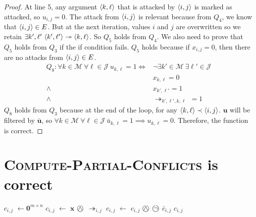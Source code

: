 \begin{proof}
	At line 5, any argument $\langle{k},{\ell}\rangle$ that is attacked by $\langle{i},{j}\rangle$ is marked as attacked, so $u_{i,j}=0$. The attack from $\langle{i},{j}\rangle$ is relevant because from $Q_4$, we know that $\langle{i},{j}\rangle\in E$. But at the next iteration, values $i$ and $j$ are overwritten so we retain $\exists k',\ell'\ \langle{k'},{\ell'}\rangle\twoheadrightarrow\langle{k},{\ell}\rangle$. So $Q_5$ holds from $Q_4$.
	\linespace
	We also need to prove that $Q_5$ holds from $Q_3$ if the if condition fails. $Q_5$ holds because if $x_{i,j}=0$, then there are no attacks from $\langle{i},{j}\rangle\in E$.
	\begin{align*}
		Q_8: \forall k\in\mathcal{M}\ \forall\ell\in\mathcal{J}\ u_{k,\ell}=1\iff&\neg\exists k'\in\mathcal{M}\ \exists\ell'\in\mathcal{J}\\
		&x_{k,\ell}=0\\
		\land\ &x_{k',\ell'}=1\\
		\land\ &\twoheadrightarrow_{k',\ell',k,\ell}\ =1
	\end{align*}
	$Q_8$ holds from $Q_3$ because at the end of the loop, for any $\langle{k},{\ell}\rangle\prec\langle{i},{j}\rangle$. $\mathbf{u}$ will be filtered by $\bar{\mathbf{u}}$, so $\forall k\in\mathcal{M}\ \forall\ell\in\mathcal{J}\ \bar{u}_{k,\ell}=1\implies u_{k,\ell}=0$. Therefore, the function is correct.
\end{proof}

\section{\textsc{Compute-Partial-Conflicts} is correct}

\begin{algorithm}[H]
	\begin{algorithmic}[1]
			\State $c_{i,j}$ $\gets\mathbf{0}^{m\times n}$
				\State $c_{i,j}$ $\gets$ $\mathbf{x}$ $\incircbin{\land}$ $\twoheadrightarrow_{i,j}$ 
			\EndIf
			\State $c_{i,j}$ $\gets$ $c_{i,j}$ $\incircbin{\land}$ $\incircbin{\neg}$ $\bar{c}_{i,j}$
			\State \Return $c_{i,j}$
		\EndFunction
	\end{algorithmic}
\end{algorithm}

